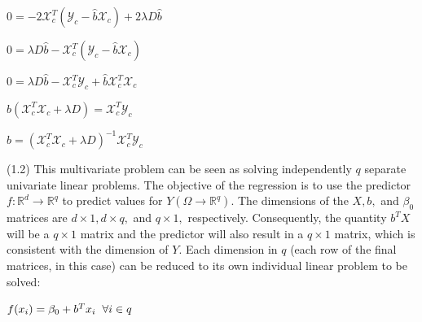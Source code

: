 \begin{center}
    $0 = -2\mathcal{X}_{c}^{T}(\mathcal{Y}_{c} - \hat{b}\mathcal{X}_{c}) + 2\lambda D \hat{b}$

    $0 = \lambda D \hat{b} - \mathcal{X}_{c}^{T}(\mathcal{Y}_{c} - \hat{b}\mathcal{X}_{c})$
    
    $0 = \lambda D \hat{b} - \mathcal{X}_{c}^{T}\mathcal{Y}_{c} + \hat{b}\mathcal{X}_{c}^{T}\mathcal{X}_{c}$
    
    $\hat{b}(\mathcal{X}_{c}^{T}\mathcal{X}_{c} + \lambda D) =  \mathcal{X}_{c}^{T}\mathcal{Y}_{c}$
    
    $\hat{b} = (\mathcal{X}_{c}^{T}\mathcal{X}_{c} + \lambda D)^{-1} \mathcal{X}_{c}^{T}\mathcal{Y}_{c}$
\end{center}
\vspace{5mm}
(1.2) This multivariate problem can be seen as solving independently $q$ separate univariate linear problems. The objective of the regression is to use the predictor $f : \mathbb{R}^{d} \rightarrow \mathbb{R}^{q}$ to predict values for $Y (\Omega \rightarrow \mathbb{R}^{q})$. The dimensions of the $X, b,$ and $\beta_{0}$ matrices are $d \times 1, d \times q,$ and $q \times 1,$ respectively. Consequently, the quantity $b^{T}X$ will be a $q \times 1$ matrix and the predictor will also result in a $q \times 1$ matrix, which is consistent with the dimension of $Y$. Each dimension in $q$ (each row of the final matrices, in this case) can be reduced to its own individual linear problem to be solved:
\begin{center}
    $f(x_{i}) = \beta_{0} + b^{T}x_{i}\hspace{0.2cm}\forall i \in q$
\end{center}
\vspace{5mm}

